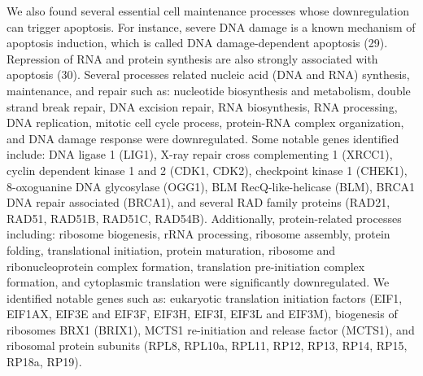 \documentclass[
]{article}
\begin{document}
We also found several essential cell maintenance processes whose
downregulation can trigger apoptosis. For instance, severe DNA damage is
a known mechanism of apoptosis induction, which is called DNA
damage-dependent apoptosis (29). Repression of RNA and protein synthesis
are also strongly associated with apoptosis (30). Several processes
related nucleic acid (DNA and RNA) synthesis, maintenance, and repair
such as: nucleotide biosynthesis and metabolism, double strand break
repair, DNA excision repair, RNA biosynthesis, RNA processing, DNA
replication, mitotic cell cycle process, protein-RNA complex
organization, and DNA damage response were downregulated. Some notable
genes identified include: DNA ligase 1 (LIG1), X-ray repair cross
complementing 1 (XRCC1), cyclin dependent kinase 1 and 2 (CDK1, CDK2),
checkpoint kinase 1 (CHEK1), 8-oxoguanine DNA glycosylase (OGG1), BLM
RecQ-like-helicase (BLM), BRCA1 DNA repair associated (BRCA1), and
several RAD family proteins (RAD21, RAD51, RAD51B, RAD51C, RAD54B).
Additionally, protein-related processes including: ribosome biogenesis,
rRNA processing, ribosome assembly, protein folding, translational
initiation, protein maturation, ribosome and ribonucleoprotein complex
formation, translation pre-initiation complex formation, and cytoplasmic
translation were significantly downregulated. We identified notable
genes such as: eukaryotic translation initiation factors (EIF1, EIF1AX,
EIF3E and EIF3F, EIF3H, EIF3I, EIF3L and EIF3M), biogenesis of ribosomes
BRX1 (BRIX1), MCTS1 re-initiation and release factor (MCTS1), and
ribosomal protein subunits (RPL8, RPL10a, RPL11, RP12, RP13, RP14, RP15,
RP18a, RP19).
\end{document}
